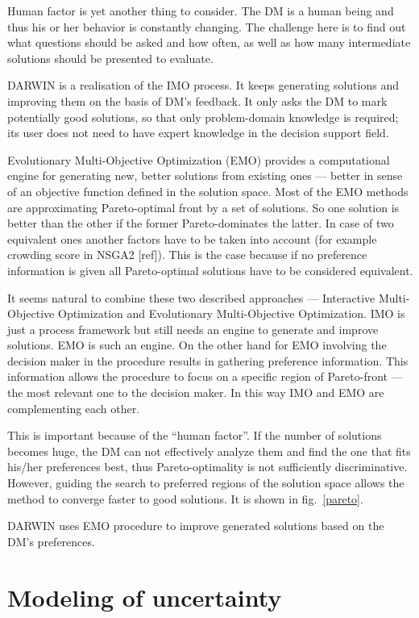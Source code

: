 Human factor is yet another thing to consider. The DM is a human being and
thus his or her behavior is constantly changing. The challenge here is to find
out what questions should be asked and how often, as well as how many
intermediate solutions should be presented to evaluate.

DARWIN is a realisation of the IMO process. It keeps generating solutions and
improving them on the basis of DM's feedback. It only asks the DM to mark
potentially good solutions, so that only problem-domain knowledge is required;
its user does not need to have expert knowledge in the decision support field.

Evolutionary Multi-Objective Optimization (EMO) provides a computational
engine for generating new, better solutions from existing ones --- better in
sense of an objective function defined in the solution space. Most of the EMO
methods are approximating Pareto-optimal front by a set of solutions. So one
solution is better than the other if the former Pareto-dominates the
latter. In case of two equivalent ones another factors have to be taken into
account (for example crowding score in NSGA2 [ref]). This is the case because
if no preference information is given all Pareto-optimal solutions have to be
considered equivalent.

It seems natural to combine these two described approaches --- Interactive
Multi-Objective Optimization and Evolutionary Multi-Objective
Optimization. IMO is just a process framework but still needs an engine to
generate and improve solutions. EMO is such an engine. On the other hand for
EMO involving the decision maker in the procedure results in gathering
preference information. This information allows the procedure to focus on a
specific region of Pareto-front --- the most relevant one to the decision
maker. In this way IMO and EMO are complementing each other.

This is important because of the ``human factor''. If the number of solutions
becomes huge, the DM can not effectively analyze them and find the one that
fits his/her preferences best, thus Pareto-optimality is not sufficiently
discriminative. However, guiding the search to preferred regions of the
solution space allows the method to converge faster to good solutions. It is
shown in fig.~\ref{pareto}.

DARWIN uses EMO procedure to improve generated solutions based on the DM's
preferences.


\section{Modeling of uncertainty}
\label{uncert-mod}

